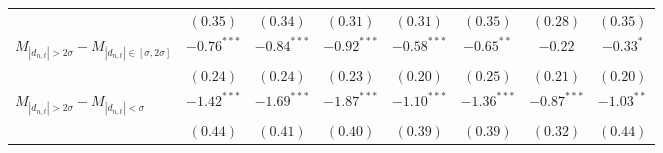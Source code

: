 \begin{tabular}{lccccccc}
   & $(0.35)$ & $(0.34)$ & $(0.31)$ & $(0.31)$ & $(0.35)$ & $(0.28)$ & $(0.35)$ \\ 
  $M_{|d_{n,t}| > 2 \sigma} - M_{|d_{n,t}| \in [\sigma, 2\sigma]}$ & $-0.76^{***}$ & $-0.84^{***}$ & $-0.92^{***}$ & $-0.58^{***}$ & $-0.65^{**}$ & $-0.22$ & $-0.33^{*}$ \\ 
   & $(0.24)$ & $(0.24)$ & $(0.23)$ & $(0.20)$ & $(0.25)$ & $(0.21)$ & $(0.20)$ \\ 
  $M_{|d_{n,t}| > 2 \sigma} - M_{|d_{n,t}| < \sigma}$ & $-1.42^{***}$ & $-1.69^{***}$ & $-1.87^{***}$ & $-1.10^{***}$ & $-1.36^{***}$ & $-0.87^{***}$ & $-1.03^{**}$ \\ 
   & $(0.44)$ & $(0.41)$ & $(0.40)$ & $(0.39)$ & $(0.39)$ & $(0.32)$ & $(0.44)$ \\ 
   \hline 
\end{tabular}
